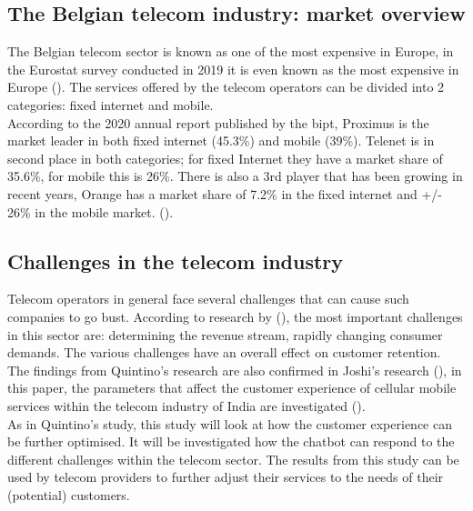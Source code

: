 \subsection{The Belgian telecom industry: market overview}
The Belgian telecom sector is known as one of the most expensive in Europe, in the Eurostat survey conducted in 2019 it is even known as the most expensive in Europe (\cite{Eurostat2020}). The services offered by the telecom operators can be divided into 2 categories: fixed internet and mobile.\\
\break
According to the 2020 annual report published by the \acrfull{bipt}, Proximus is the market leader in both fixed internet (45.3\%) and mobile (39\%). Telenet is in second place in both categories; for fixed Internet they have a market share of 35.6\%, for mobile this is 26\%. There is also a 3rd player that has been growing in recent years, Orange has a market share of 7.2\% in the fixed internet and +/- 26\% in the mobile market. (\cite{BIPT2021,VanLeemputten2021}).\\

\subsection{Challenges in the telecom industry}
Telecom operators in general face several challenges that can cause such companies to go bust. According to research by \citeauthor{Quintino2019} (\cite{Quintino2019, Malviya2012}), the most important challenges in this sector are: determining the revenue stream, rapidly changing consumer demands. The various challenges have an overall effect on customer retention. The findings from Quintino's research are also confirmed in Joshi's research (\cite{Joshi2014}), in this paper, the parameters that affect the customer experience of cellular mobile services within the telecom industry of India are investigated (\cite{Joshi2014, Quintino2019, Malviya2012}).\\
\break
As in Quintino's study, this study will look at how the customer experience can be further optimised. It will be investigated how the chatbot can respond to the different challenges within the telecom sector. The results from this study can be used by telecom providers to further adjust their services to the needs of their (potential) customers.

